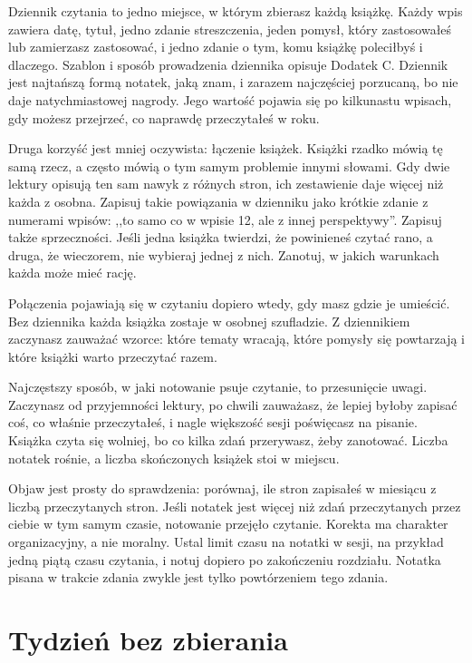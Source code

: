 Dziennik czytania to jedno miejsce, w którym zbierasz każdą książkę. Każdy wpis zawiera datę, tytuł, jedno zdanie streszczenia, jeden pomysł, który zastosowałeś lub zamierzasz zastosować, i jedno zdanie o tym, komu książkę poleciłbyś i dlaczego. Szablon i sposób prowadzenia dziennika opisuje Dodatek C. Dziennik jest najtańszą formą notatek, jaką znam, i zarazem najczęściej porzucaną, bo nie daje natychmiastowej nagrody. Jego wartość pojawia się po kilkunastu wpisach, gdy możesz przejrzeć, co naprawdę przeczytałeś w roku.

Druga korzyść jest mniej oczywista: łączenie książek. Książki rzadko mówią tę samą rzecz, a często mówią o tym samym problemie innymi słowami. Gdy dwie lektury opisują ten sam nawyk z różnych stron, ich zestawienie daje więcej niż każda z osobna. Zapisuj takie powiązania w dzienniku jako krótkie zdanie z numerami wpisów: ,,to samo co w wpisie 12, ale z innej perspektywy''. Zapisuj także sprzeczności. Jeśli jedna książka twierdzi, że powinieneś czytać rano, a druga, że wieczorem, nie wybieraj jednej z nich. Zanotuj, w jakich warunkach każda może mieć rację.

Połączenia pojawiają się w czytaniu dopiero wtedy, gdy masz gdzie je umieścić. Bez dziennika każda książka zostaje w osobnej szufladzie. Z dziennikiem zaczynasz zauważać wzorce: które tematy wracają, które pomysły się powtarzają i które książki warto przeczytać razem.

\begin{falle}[Pułapka]
Najczęstszy sposób, w jaki notowanie psuje czytanie, to przesunięcie uwagi. Zaczynasz od przyjemności lektury, po chwili zauważasz, że lepiej byłoby zapisać coś, co właśnie przeczytałeś, i nagle większość sesji poświęcasz na pisanie. Książka czyta się wolniej, bo co kilka zdań przerywasz, żeby zanotować. Liczba notatek rośnie, a liczba skończonych książek stoi w miejscu.

Objaw jest prosty do sprawdzenia: porównaj, ile stron zapisałeś w miesiącu z liczbą przeczytanych stron. Jeśli notatek jest więcej niż zdań przeczytanych przez ciebie w tym samym czasie, notowanie przejęło czytanie. Korekta ma charakter organizacyjny, a nie moralny. Ustal limit czasu na notatki w sesji, na przykład jedną piątą czasu czytania, i notuj dopiero po zakończeniu rozdziału. Notatka pisana w trakcie zdania zwykle jest tylko powtórzeniem tego zdania.
\end{falle}

\section{Tydzień bez zbierania}

